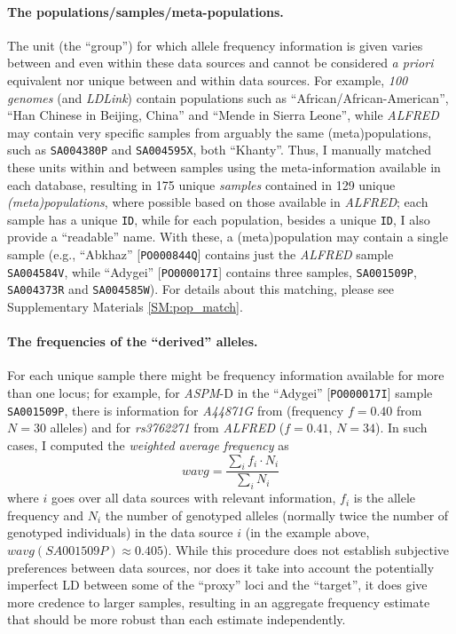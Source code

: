 \documentclass[twoside,onecolumn]{article}
\begin{document}
\paragraph{The populations/samples/meta-populations.}
The unit (the ``group'') for which allele frequency information is given varies between and even within these data sources and cannot be considered \textit{a priori} equivalent nor unique between and within data sources.
For example, \textit{100 genomes} (and \textit{LDLink}) contain populations such as ``African/African-American'', ``Han Chinese in Beijing, China'' and ``Mende in Sierra Leone'', while \textit{ALFRED} may contain very specific samples from arguably the same (meta)populations, such as \texttt{SA004380P} and \texttt{SA004595X}, both ``Khanty''.
Thus, I manually matched these units within and between samples using the meta-information available in each database, resulting in 175 unique \emph{samples} contained in 129 unique \emph{(meta)populations}, where possible based on those available in \textit{ALFRED}; each sample has a unique \texttt{ID}, while for each population, besides a unique \texttt{ID}, I also provide a ``readable'' name.
With these, a (meta)population may contain a single sample (e.g., ``Abkhaz'' [\texttt{PO000844Q}] contains just the \textit{ALFRED} sample \texttt{SA004584V}, while ``Adygei'' [\texttt{PO000017I}] contains three samples, \texttt{SA001509P}, \texttt{SA004373R} and \texttt{SA004585W}).
For details about this matching, please see Supplementary Materials \ref{SM:pop_match}.

\paragraph{The frequencies of the ``derived'' alleles.}
For each unique sample there might be frequency information available for more than one locus; for example, for \textit{ASPM}-D in the ``Adygei'' [\texttt{PO000017I}] sample \texttt{SA001509P}, there is information for \textit{A44871G} from \citet{mekelbobrov_aspm_2005} (frequency $f=0.40$ from $N=30$ alleles) and for \textit{rs3762271} from \textit{ALFRED} ($f=0.41$, $N=34$).
In such cases, I computed the \emph{weighted average frequency} as
$$wavg = \frac{\sum_{i}{f_{i} \cdot N_{i}}}{\sum_{i}{N_{i}}}$$
where $i$ goes over all data sources with relevant information, $f_{i}$ is the allele frequency and $N_{i}$ the number of genotyped alleles (normally twice the number of genotyped individuals) in the data source $i$ (in the example above, $wavg(SA001509P) \approx 0.405$).
While this procedure does not establish subjective preferences between data sources, nor does it take into account the potentially imperfect LD between some of the ``proxy'' loci and the ``target'', it does give more credence to larger samples, resulting in an aggregate frequency estimate that should be more robust than each estimate independently.
\end{document}
